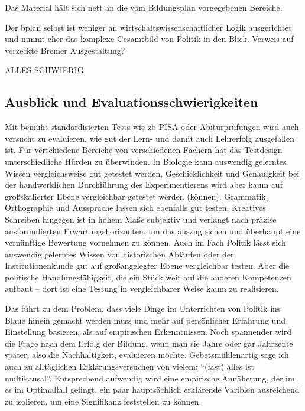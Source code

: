 Das Material hält sich nett an die vom Bildungsplan vorgegebenen Bereiche. 

Der bplan selbst ist weniger an wirtschaftswissenschaftlicher Logik ausgerichtet und nimmt eher das komplexe Gesamtbild von Politik in den Blick.
Verweis auf verzeckte Bremer Ausgestaltung?

ALLES SCHWIERIG

\subsection{Ausblick und Evaluationsschwierigkeiten}
Mit bemüht standardisierten Tests wie \gls{zb} PISA oder Abiturprüfungen wird auch versucht zu evaluieren, wie gut der Lern- und damit auch Lehrerfolg ausgefallen ist. Für verschiedene Bereiche von verschiedenen Fächern hat das Testdesign unterschiedliche Hürden zu überwinden. 
In Biologie kann auswendig gelerntes Wissen vergleichsweise gut getestet werden, Geschicklichkeit und Genauigkeit bei der handwerklichen Durchführung des Experimentierens wird aber kaum auf großskalierter Ebene vergleichbar getestet werden (können).
Grammatik, Orthographie und Aussprache lassen sich ebenfalls gut testen. Kreatives Schreiben hingegen ist in hohem Maße subjektiv und verlangt nach präzise ausformulierten Erwartungshorizonten, um das auszugleichen und überhaupt eine vernünftige Bewertung vornehmen zu können. 
Auch im Fach Politik lässt sich auswendig gelerntes Wissen von historischen Abläufen oder der Institutionenkunde gut auf großangelegter Ebene vergleichbar testen. Aber die politische Handlungsfähigkeit, die ein Stück weit auf die anderen Kompetenzen aufbaut -- dort ist eine Testung in vergleichbarer Weise kaum zu realisieren. 

Das führt zu dem Problem, dass viele Dinge im Unterrichten von Politik ins Blaue hinein gemacht werden muss und mehr auf persönlicher Erfahrung und Einstellung basieren, als auf empirischen Erkenntnissen.
Noch spannender wird die Frage nach dem Erfolg der Bildung, wenn man sie Jahre oder gar Jahrzente später, also die Nachhaltigkeit, evaluieren möchte. Gebetsmühlenartig sage ich auch zu alltäglichen Erklärungsversuchen von vielem: \enquote{(fast) alles ist multikausal}. Entsprechend aufwendig wird eine empirische Annäherung, der im es im Optimalfall gelingt, ein paar hauptsächlich erklärende Variblen ausreichend zu isolieren, um eine Signifikanz feststellen zu können. 


